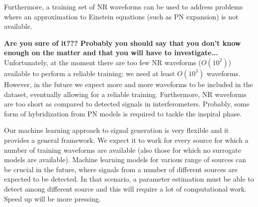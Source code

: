 Furthermore, a training set of NR waveforms can be used to address problems where an approximation to Einstein equations (such as PN expansion) is not available.
\par
\textbf{Are you sure of it??? Probably you should say that you don't know enough on the matter and that you will have to investigate...}\\
Unfortunately, at the moment there are too few NR waveforms ($O(10^2)$) available to perform a reliable training: we need at least $O(10^3)$ waveforms. However, in the future we expect more and more waveforms to be included in the dataset, eventually allowing for a reliable training.
Furthermore, NR waveforms are too short as compared to detected signals in interferometers. Probably, some form of hybridization from PN models is required to tackle the inspiral phase.
\par
Our machine learning approach to signal generation is very flexible and it provides a general framework. We expect it to work for every source for which a number of training waveforms are available (also those for which no surrogate models are available).
Machine learning models for various range of sources can be crucial in the future, where signals from a number of different sources are expected to be detected. In that scenario, a parameter estimation must be able to detect among different source and this will require a lot of computational work. Speed up will be more pressing.












